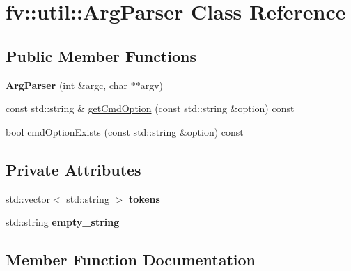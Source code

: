 \hypertarget{classfv_1_1util_1_1ArgParser}{}\section{fv\+:\+:util\+:\+:Arg\+Parser Class Reference}
\label{classfv_1_1util_1_1ArgParser}
\subsection*{Public Member Functions}
\begin{DoxyCompactItemize}
\item 
\hypertarget{classfv_1_1util_1_1ArgParser_a4b712cf16ae946cd1c651e4275f1c39b}{}\label{classfv_1_1util_1_1ArgParser_a4b712cf16ae946cd1c651e4275f1c39b} 
{\bfseries Arg\+Parser} (int \&argc, char $\ast$$\ast$argv)
\item 
const std\+::string \& \hyperlink{classfv_1_1util_1_1ArgParser_aaeb266ab0e49cfee9691c8ad578a7688}{get\+Cmd\+Option} (const std\+::string \&option) const
\item 
bool \hyperlink{classfv_1_1util_1_1ArgParser_a4a1b9f8a41c5a6793a7b8f4ad82fc99c}{cmd\+Option\+Exists} (const std\+::string \&option) const
\end{DoxyCompactItemize}
\subsection*{Private Attributes}
\begin{DoxyCompactItemize}
\item 
\hypertarget{classfv_1_1util_1_1ArgParser_ac36e685804472836ec1e698937275242}{}\label{classfv_1_1util_1_1ArgParser_ac36e685804472836ec1e698937275242} 
std\+::vector$<$ std\+::string $>$ {\bfseries tokens}
\item 
\hypertarget{classfv_1_1util_1_1ArgParser_a3924e22ef57f754eb6f9c03a36952b80}{}\label{classfv_1_1util_1_1ArgParser_a3924e22ef57f754eb6f9c03a36952b80} 
std\+::string {\bfseries empty\+\_\+string}
\end{DoxyCompactItemize}


\subsection{Member Function Documentation}
\hypertarget{classfv_1_1util_1_1ArgParser_a4a1b9f8a41c5a6793a7b8f4ad82fc99c}{}\label{classfv_1_1util_1_1ArgParser_a4a1b9f8a41c5a6793a7b8f4ad82fc99c} 
